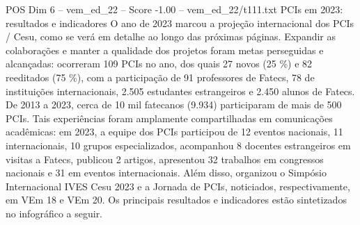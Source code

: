 \begin{textsample}{POS Dim 6 – vem\_ed\_22 – Score -1.00 – vem\_ed\_22/t111.txt}  \label{ex:f6_pos_050}
PCIs em 2023: resultados e indicadores O ano de 2023 marcou a projeção internacional dos PCIs / Cesu, como se verá em detalhe ao longo das próximas páginas.
Expandir as colaborações e manter a qualidade dos projetos foram metas perseguidas e alcançadas: ocorreram 109 PCIs no ano, dos quais 27 novos (25 \%) e 82 reeditados (75 \%), com a participação de 91 professores de Fatecs, 78 de instituições internacionais, 2.505 estudantes estrangeiros e 2.450 alunos de Fatecs.
De 2013 a 2023, cerca de 10 mil fatecanos (9.934) participaram de mais de 500 PCIs.
Tais experiências foram amplamente compartilhadas em comunicações acadêmicas: em 2023, a equipe dos PCIs participou de 12 eventos nacionais, 11 internacionais, 10 grupos especializados, acompanhou 8 docentes estrangeiros em visitas a Fatecs, publicou 2 artigos, apresentou 32 trabalhos em congressos nacionais e 31 em eventos internacionais.
Além disso, organizou o Simpósio Internacional IVES Cesu 2023 e a Jornada de PCIs, noticiados, respectivamente, em VEm 18 e VEm 20.
Os principais resultados e indicadores estão sintetizados no infográfico a seguir.

\end{textsample}
